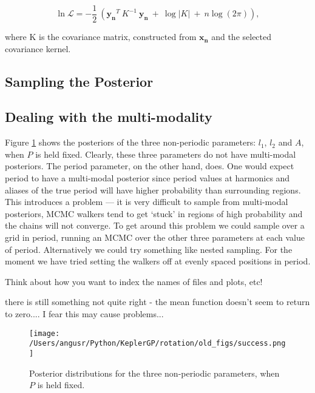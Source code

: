 \documentclass[12pt,preprint]{aastex}
\begin{document}
\begin{equation}
	\ln{\mathcal{L}} = -\frac{1}{2}~\left(\mathbf{y_n}^T~K^{-1}~\mathbf{y_n}~ + ~\log{|K| ~+~ n\log(2\pi)} \right),
\end{equation}

where K is the covariance matrix, constructed from $\mathbf{x_n}$ and the selected covariance kernel.

\subsection{Sampling the Posterior}

\subsection{Dealing with the multi-modality}

Figure \ref{fig:fixed_period} shows the posteriors of the three non-periodic parameters: $l_1$, $l_2$ and $A$, when $P$ is held fixed.
Clearly, these three parameters do not have multi-modal posteriors.
The period parameter, on the other hand, does.
One would expect period to have a multi-modal posterior since period values at harmonics and aliases of the true period will have higher probability than surrounding regions.
This introduces a problem --- it is very difficult to sample from multi-modal posteriors, MCMC walkers tend to get `stuck' in regions of high probability and the chains will not converge.
To get around this problem we could sample over a grid in period, running an MCMC over the other three parameters at each value of period.
Alternatively we could try something like nested sampling.
For the moment we have tried setting the walkers off at evenly spaced positions in period.

Think about how you want to index the names of files and plots, etc!

there is still something not quite right - the mean function doesn't seem to return to zero.... I fear this may cause problems...

\begin{figure}[ht]
\begin{center}
\texttt{[image: /Users/angusr/Python/KeplerGP/rotation/old\_figs/success.png]}
\caption{Posterior distributions for the three non-periodic parameters, when $P$ is held fixed.}
\label{fig:fixed_period}
\end{center}
\end{figure}
\end{document}
